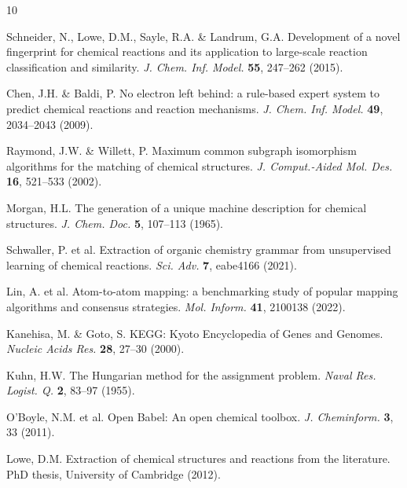 \documentclass[12pt,a4paper]{article}
\begin{document}
\begin{thebibliography}{10}

Schneider, N., Lowe, D.M., Sayle, R.A. \& Landrum, G.A.
Development of a novel fingerprint for chemical reactions and its application to large-scale reaction classification and similarity.
\textit{J. Chem. Inf. Model.} \textbf{55}, 247--262 (2015).

Chen, J.H. \& Baldi, P.
No electron left behind: a rule-based expert system to predict chemical reactions and reaction mechanisms.
\textit{J. Chem. Inf. Model.} \textbf{49}, 2034--2043 (2009).

Raymond, J.W. \& Willett, P.
Maximum common subgraph isomorphism algorithms for the matching of chemical structures.
\textit{J. Comput.-Aided Mol. Des.} \textbf{16}, 521--533 (2002).

Morgan, H.L.
The generation of a unique machine description for chemical structures.
\textit{J. Chem. Doc.} \textbf{5}, 107--113 (1965).

Schwaller, P. et al.
Extraction of organic chemistry grammar from unsupervised learning of chemical reactions.
\textit{Sci. Adv.} \textbf{7}, eabe4166 (2021).

Lin, A. et al.
Atom-to-atom mapping: a benchmarking study of popular mapping algorithms and consensus strategies.
\textit{Mol. Inform.} \textbf{41}, 2100138 (2022).

Kanehisa, M. \& Goto, S.
KEGG: Kyoto Encyclopedia of Genes and Genomes.
\textit{Nucleic Acids Res.} \textbf{28}, 27--30 (2000).

Kuhn, H.W.
The Hungarian method for the assignment problem.
\textit{Naval Res. Logist. Q.} \textbf{2}, 83--97 (1955).

O'Boyle, N.M. et al.
Open Babel: An open chemical toolbox.
\textit{J. Cheminform.} \textbf{3}, 33 (2011).

Lowe, D.M.
Extraction of chemical structures and reactions from the literature.
PhD thesis, University of Cambridge (2012).

\end{thebibliography}
\end{document}
